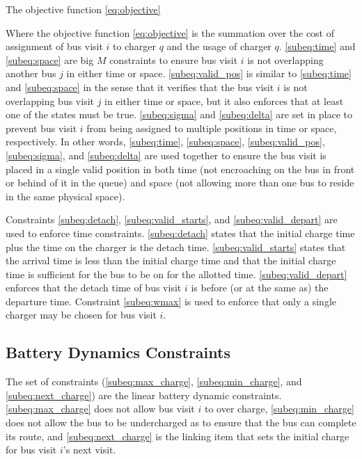 \documentclass[letterpaper, 10pt, conference]{IEEEtran}
\begin{document}
The objective function \eqref{eq:objective}

Where the objective function \eqref{eq:objective} is the summation over the cost of assignment of bus visit \(i\) to charger \(q\) and the usage of charger \(q\). \eqref{subeq:time} and \eqref{subeq:space} are big \(M\) constraints to ensure bus visit \(i\) is not overlapping another bus \(j\) in either time or space. \eqref{subeq:valid_pos} is similar to \eqref{subeq:time} and \eqref{subeq:space} in the sense that it verifies that the bus visit \(i\) is not overlapping bus visit \(j\) in either time or space, but it also enforces that at least one of the states must be true. \eqref{subeq:sigma} and \eqref{subeq:delta} are set in place to prevent bus visit \(i\) from being assigned to multiple positions in time or space, respectively. In other words, \eqref{subeq:time}, \eqref{subeq:space}, \eqref{subeq:valid_pos}, \eqref{subeq:sigma}, and \eqref{subeq:delta} are used together to ensure the bus visit is placed in a single valid position in both time (not encroaching on the bus in front or behind of it in the queue) and space (not allowing more than one bus to reside in the same physical space).

 Constraints \eqref{subeq:detach}, \eqref{subeq:valid_starts}, and \eqref{subeq:valid_depart} are used to enforce time constraints. \eqref{subeq:detach} states that the initial charge time plus the time on the charger is the detach time. \eqref{subeq:valid_starts} states that the arrival time is less than the initial charge time and that the initial charge time is sufficient for the bus to be on for the allotted time. \eqref{subeq:valid_depart} enforces that the detach time of bus visit \(i\) is before (or at the same as) the departure time. Constraint \eqref{subeq:wmax} is used to enforce that only a single charger may be chosen for bus visit \(i\).

\subsection{Battery Dynamics Constraints}
The set of constraints (\eqref{subeq:max_charge}, \eqref{subeq:min_charge}, and \eqref{subeq:next_charge}) are the linear battery dynamic constraints. \eqref{subeq:max_charge} does not allow bus visit \(i\) to over charge, \eqref{subeq:min_charge} does not allow the bus to be undercharged as to ensure that the bus can complete its route, and \eqref{subeq:next_charge} is the linking item that sets the initial charge for bus visit \(i\)'s next visit.
\end{document}
